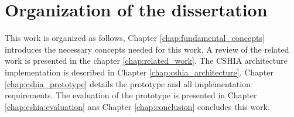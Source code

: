 
\section{Organization of the dissertation}
\label{sec:organization_of_dissertation}
This work is organized as follows, Chapter \ref{chap:fundamental_concepts} introduces the necessary concepts  needed for this work. A review of the related work is presented in the chapter \ref{chap:related_work}.  The CSHIA architecture implementation is described in Chapter \ref{chap:cshia_architecture}. Chapter \ref{chap:cshia_prototype} details the prototype and all implementation requirements. The evaluation of the prototype is presented in Chapter \ref{chap:cshia:evaluation} ans Chapter \ref{chap:conclusion} concludes this work.


